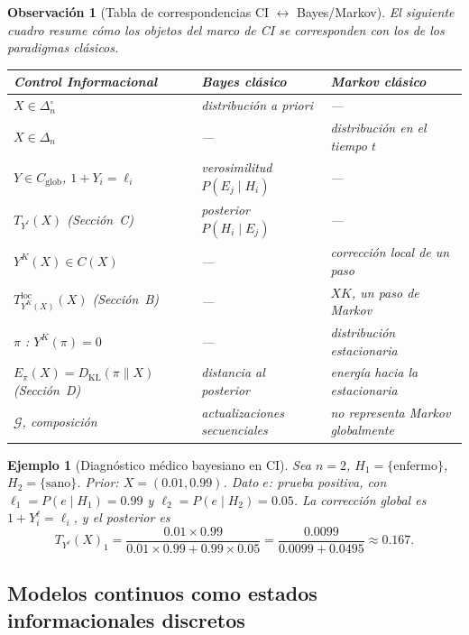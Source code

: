 ﻿\documentclass[12pt]{article}
\newtheorem{observacion}{Observación}[section]
\newtheorem{ejemplo}{Ejemplo}[section]
\begin{document}
\begin{observacion}[Tabla de correspondencias CI $\leftrightarrow$ Bayes/Markov]\label{obs:tabla_correspondencias}
El siguiente cuadro resume cómo los objetos del marco de CI se corresponden con los de los paradigmas clásicos.

\medskip
\begin{center}
\begin{tabular}{lll}
\toprule
\textbf{Control Informacional} & \textbf{Bayes clásico} & \textbf{Markov clásico} \\
\midrule
$X \in \Delta_n^\circ$ & distribución a priori & --- \\
$X \in \Delta_n$ & --- & distribución en el tiempo $t$ \\
$Y \in C_{\mathrm{glob}}$, $1+Y_i = \ell_i$ & verosimilitud $P(E_j\mid H_i)$ & --- \\
$T_{Y^\ell}(X)$ (Sección~C) & posterior $P(H_i\mid E_j)$ & --- \\
$Y^K(X) \in C(X)$ & --- & corrección local de un paso \\
$T^{\mathrm{loc}}_{Y^K(X)}(X)$ (Sección~B) & --- & $XK$, un paso de Markov \\
$\pi$ : $Y^K(\pi)=0$ & --- & distribución estacionaria \\
$E_\pi(X) = D_{\mathrm{KL}}(\pi\|X)$ (Sección~D) & distancia al posterior & energía hacia la estacionaria \\
$\mathcal{G}$, composición & actualizaciones secuenciales & no representa Markov globalmente \\
\bottomrule
\end{tabular}
\end{center}
\end{observacion}

\begin{ejemplo}[Diagnóstico médico bayesiano en CI]\label{ej:diagnostico}
Sea $n=2$, $H_1 = \{\text{enfermo}\}$, $H_2 = \{\text{sano}\}$. Prior: $X=(0.01, 0.99)$. Dato $e$: prueba positiva, con $\ell_1 = P(e\mid H_1)=0.99$ y $\ell_2=P(e\mid H_2)=0.05$. La corrección global es $1+Y_i^\ell = \ell_i$, y el posterior es
\[
T_{Y^\ell}(X)_1 = \frac{0.01\times 0.99}{0.01\times 0.99 + 0.99\times 0.05} = \frac{0.0099}{0.0099+0.0495} \approx 0.167.
\]
\end{ejemplo}

\subsection{Modelos continuos como estados informacionales discretos}
\end{document}
